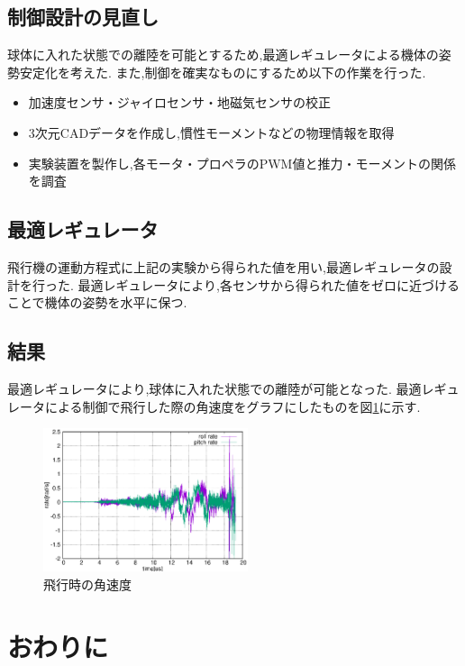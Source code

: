 \documentclass[twocolumn,11pt]{sotsuken_abst}
\begin{document}
\subsection{制御設計の見直し}
球体に入れた状態での離陸を可能とするため,最適レギュレータによる機体の姿勢安定化を考えた.
また,制御を確実なものにするため以下の作業を行った.

\begin{itemize}
	\item 加速度センサ・ジャイロセンサ・地磁気センサの校正
	\item 3次元CADデータを作成し,慣性モーメントなどの物理情報を取得
	\item 実験装置を製作し,各モータ・プロペラのPWM値と推力・モーメントの関係を調査
\end{itemize}

\subsection{最適レギュレータ}
飛行機の運動方程式に上記の実験から得られた値を用い,最適レギュレータの設計を行った.
最適レギュレータにより,各センサから得られた値をゼロに近づけることで機体の姿勢を水平に保つ.

\subsection{結果}
最適レギュレータにより,球体に入れた状態での離陸が可能となった.
最適レギュレータによる制御で飛行した際の角速度をグラフにしたものを図\ref{fig:gyro}に示す.

\begin{figure}[htbp]
	\begin{center}
		\includegraphics[width=60mm]{image/gyro.eps}
		\caption{飛行時の角速度}
		\label{fig:gyro}
	\end{center}
\end{figure}


\section{おわりに}
\end{document}
